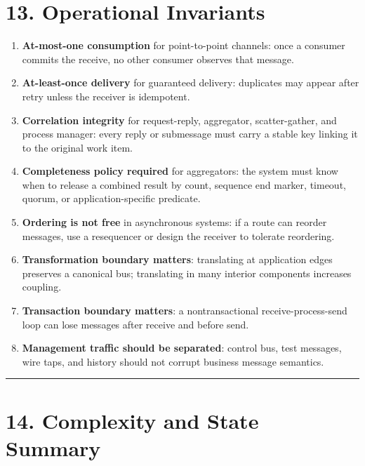 \documentclass[11pt]{article}
\providecommand{\tightlist}{\setlength{\itemsep}{0pt}\setlength{\parskip}{0pt}}
\begin{document}
\section{13. Operational Invariants}\label{operational-invariants}

\begin{enumerate}
\def\labelenumi{\arabic{enumi}.}
\tightlist
\item
  \textbf{At-most-one consumption} for point-to-point channels: once a
  consumer commits the receive, no other consumer observes that message.
\item
  \textbf{At-least-once delivery} for guaranteed delivery: duplicates
  may appear after retry unless the receiver is idempotent.
\item
  \textbf{Correlation integrity} for request-reply, aggregator,
  scatter-gather, and process manager: every reply or submessage must
  carry a stable key linking it to the original work item.
\item
  \textbf{Completeness policy required} for aggregators: the system must
  know when to release a combined result by count, sequence end marker,
  timeout, quorum, or application-specific predicate.
\item
  \textbf{Ordering is not free} in asynchronous systems: if a route can
  reorder messages, use a resequencer or design the receiver to tolerate
  reordering.
\item
  \textbf{Transformation boundary matters}: translating at application
  edges preserves a canonical bus; translating in many interior
  components increases coupling.
\item
  \textbf{Transaction boundary matters}: a nontransactional
  receive-process-send loop can lose messages after receive and before
  send.
\item
  \textbf{Management traffic should be separated}: control bus, test
  messages, wire taps, and history should not corrupt business message
  semantics.
\end{enumerate}

\begin{center}\rule{0.5\linewidth}{0.5pt}\end{center}

\section{14. Complexity and State
Summary}\label{complexity-and-state-summary}
\end{document}
